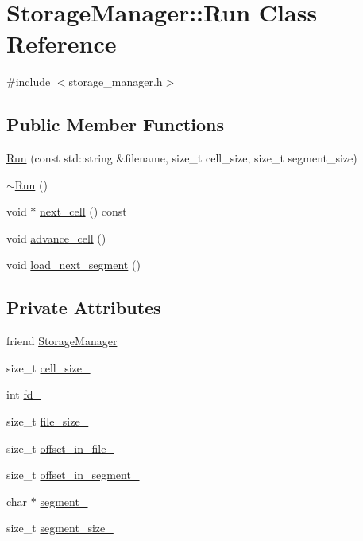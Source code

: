 \hypertarget{classStorageManager_1_1Run}{}\section{Storage\+Manager\+:\+:Run Class Reference}
\label{classStorageManager_1_1Run}


{\ttfamily \#include $<$storage\+\_\+manager.\+h$>$}

\subsection*{Public Member Functions}
\begin{DoxyCompactItemize}
\item 
\hyperlink{classStorageManager_1_1Run_aa37cb3006513e5945691cc71b06351b6}{Run} (const std\+::string \&filename, size\+\_\+t cell\+\_\+size, size\+\_\+t segment\+\_\+size)
\item 
\hyperlink{classStorageManager_1_1Run_a4ca5180d63817ff640dffa29d6033be8}{$\sim$\+Run} ()
\item 
void $\ast$ \hyperlink{classStorageManager_1_1Run_a8b1070dc7961f02a014458d665952950}{next\+\_\+cell} () const 
\item 
void \hyperlink{classStorageManager_1_1Run_adc5b043a00a5c530cc25bcc080fccfa5}{advance\+\_\+cell} ()
\item 
void \hyperlink{classStorageManager_1_1Run_a321f10db67e1a17e452113d62939bdb6}{load\+\_\+next\+\_\+segment} ()
\end{DoxyCompactItemize}
\subsection*{Private Attributes}
\begin{DoxyCompactItemize}
\item 
friend \hyperlink{classStorageManager_1_1Run_a3512c9f27a76e8f052fa0d98d8f9ff95}{Storage\+Manager}
\item 
size\+\_\+t \hyperlink{classStorageManager_1_1Run_a085f35ce859c791f5beda7f64b22f053}{cell\+\_\+size\+\_\+}
\item 
int \hyperlink{classStorageManager_1_1Run_ae40b20b29380fd5bebb8904c81a32279}{fd\+\_\+}
\item 
size\+\_\+t \hyperlink{classStorageManager_1_1Run_adbc098acabc17a7958eb7a4067bdadcf}{file\+\_\+size\+\_\+}
\item 
size\+\_\+t \hyperlink{classStorageManager_1_1Run_a6283a34a922c61fdbb863a61b1c9005b}{offset\+\_\+in\+\_\+file\+\_\+}
\item 
size\+\_\+t \hyperlink{classStorageManager_1_1Run_ac53033fb4e873a77608550a8787c06a8}{offset\+\_\+in\+\_\+segment\+\_\+}
\item 
char $\ast$ \hyperlink{classStorageManager_1_1Run_a3968c31effbd9d638615c7e04579faf3}{segment\+\_\+}
\item 
size\+\_\+t \hyperlink{classStorageManager_1_1Run_adfedc4915b956cfdb35e3a2db5e263ed}{segment\+\_\+size\+\_\+}
\end{DoxyCompactItemize}



